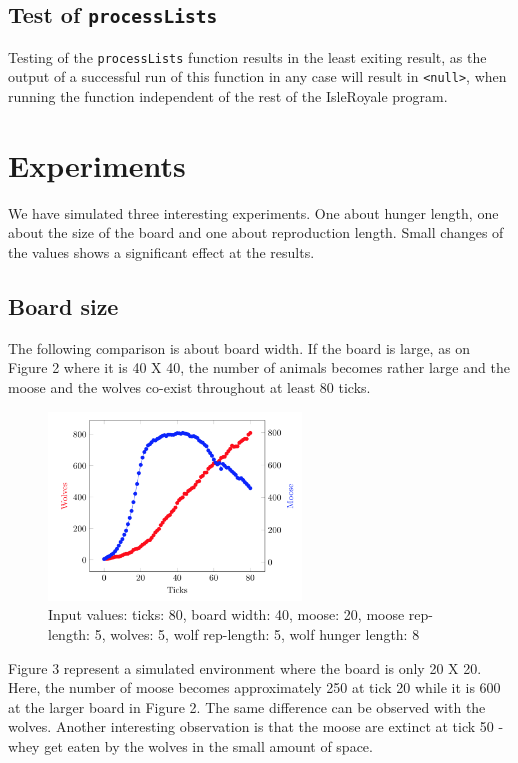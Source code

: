 \documentclass[a4paper]{report}
\begin{document}
\subsection{Test of \texttt{processLists}}
Testing of the \texttt{processLists} function results in the least exiting result, as the output of a successful run of this function in any case will result in \texttt{<null>}, when running the function 
independent of the rest of the IsleRoyale program.

\section{Experiments}
We have simulated three interesting experiments. One about hunger length, one about the size of the board and one about reproduction length. Small changes of the values shows a significant effect at the results. 

\subsection{Board size}
The following comparison is about board width. If the board is large, as on Figure 2 where it is 40 X 40, the number of animals becomes rather large and the moose and the wolves co-exist throughout at least 80 ticks. 

\begin{figure}[H]
\centering
\includegraphics[width=0.60\textwidth]{Experiments/sim_board_b1}
\caption{Input values: ticks: 80, board width: 40, moose: 20, moose rep-length: 5, wolves: 5, wolf rep-length: 5, wolf hunger length: 8}
\end{figure}

Figure 3 represent a simulated environment where the board is only 20 X 20. Here, the number of moose becomes approximately 250 at tick 20 while it is 600 at the larger board in Figure 2. The same difference can be observed with the wolves. Another interesting observation is that the moose are extinct at tick 50 - whey get eaten by the wolves in the small amount of space. 
\end{document}
